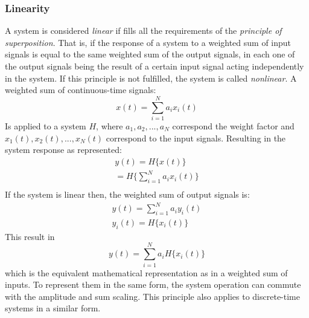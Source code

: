 \subsubsection*{Linearity}
A system is considered \textit{linear} if fills all the requirements of the \textit{principle of superposition}. That is, if the response of a system to a weighted sum of input signals is equal to the same weighted sum of the output signals, in each one of the output signals being the result of a certain input signal acting independently in the system. If this principle is not fulfilled, the system is called \textit{nonlinear}. 
A weighted sum of continuous-time signals: 
\begin{equation}
    x(t) = \sum_{i=1}^{N}a_ix_i(t)
\end{equation}
Is applied to a system $H$, where $a_1, a_2, ..., a_N$ correspond the weight factor and $x_1(t), x_2(t), ..., x_N(t)$ correspond to the input signals. Resulting in the system response as represented:
\begin{equation}
    \begin{aligned}
        y(t) = H\{x(t)\}\\
        =H\Bigg\{\sum_{i=1}^{N}a_ix_i(t)\Bigg\}\\
    \end{aligned}
\end{equation} 
If the system is linear then, the weighted sum of output signals is:
\begin{equation}
    \begin{aligned}
        y(t) = \sum_{i=1}^{N}a_i y_i(t)\\
        y_i(t) = H\{x_i(t)\}   
    \end{aligned}
\end{equation}
This result in
\begin{equation}
    y(t) = \sum_{i=1}^{N}a_i H\{x_i(t)\}    
\end{equation}
which is the equivalent mathematical representation as in a weighted sum of inputs. To represent them in the same form, the system operation can commute with the amplitude and sum scaling. This principle also applies to discrete-time systems in a similar form. 


